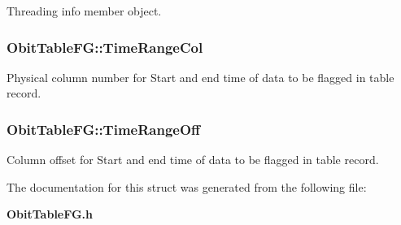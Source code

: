 Threading info member object. 

\subsubsection{ {\bf Obit\-Table\-FG::Time\-Range\-Col}}\label{structObitTableFG_o24}


Physical column number for Start and end time of data to be flagged in table record. 

\subsubsection{ {\bf Obit\-Table\-FG::Time\-Range\-Off}}\label{structObitTableFG_o23}


Column offset for Start and end time of data to be flagged in table record. 



The documentation for this struct was generated from the following file:\begin{CompactItemize}
\item 
{\bf Obit\-Table\-FG.h}\end{CompactItemize}
